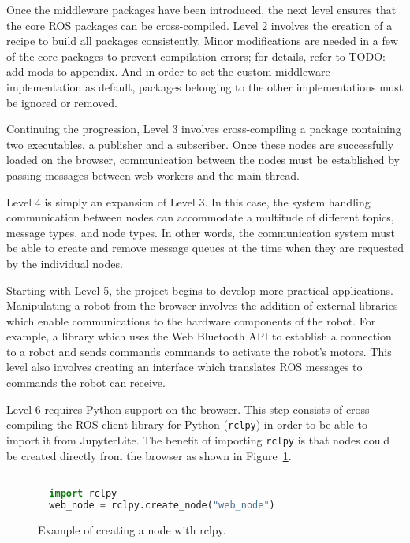         Once the middleware packages have been introduced, the next level ensures that the core \ac{ROS} packages can be cross-compiled. Level 2 involves the creation of a recipe to build all packages consistently. Minor modifications are needed in a few of the core packages to prevent compilation errors; for details, refer to TODO: add mods to appendix. And in order to set the custom middleware implementation as default, packages belonging to the other implementations must be ignored or removed. 

        Continuing the progression, Level 3 involves cross-compiling a package containing two executables, a publisher and a subscriber. Once these nodes are successfully loaded on the browser, communication between the nodes must be established by passing messages between web workers and the main thread.

        Level 4 is simply an expansion of Level 3. In this case, the system handling communication between nodes can accommodate a multitude of different topics, message types, and node types. In other words, the communication system must be able to create and remove message queues at the time when they are requested by the individual nodes.

        Starting with Level 5, the project begins to develop more practical applications. Manipulating a robot from the browser involves the addition of external libraries which enable communications to the hardware components of the robot. For example, a library which uses the Web Bluetooth \ac{API} to establish a connection to a robot and sends commands commands to activate the robot's motors. This level also involves creating an interface which translates \ac{ROS} messages to commands the robot can receive.

        Level 6 requires Python support on the browser. This step consists of cross-compiling the \ac{ROS} client library for Python (\texttt{rclpy}) in order to be able to import it from JupyterLite. The benefit of importing \texttt{rclpy} is that nodes could be created directly from the browser as shown in Figure~\ref{fig:rclpy}. 

        \begin{figure}[htbp]
            \centering
            \begin{lstlisting}[language=Python]

  import rclpy
  web_node = rclpy.create_node("web_node")
            \end{lstlisting}
            \caption{Example of creating a node with \textsf{rclpy}.}
            \label{fig:rclpy}
        \end{figure}

